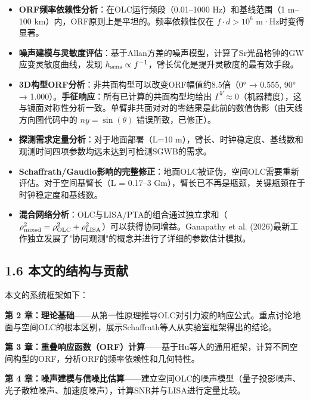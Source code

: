 \documentclass[12pt,a4paper]{article}
\begin{document}
\begin{itemize}
  \item[1] \textbf{ORF频率依赖性分析}：在OLC运行频段（0.01–1000 Hz）和基线范围（1 m–100 km）内，ORF原则上是平坦的。频率依赖性仅在 $f \cdot d > 10^6$ m·Hz时变得显著。

  \item[2] \textbf{噪声建模与灵敏度评估}：基于Allan方差的噪声模型，计算了Sr光晶格钟的GW应变灵敏度曲线，发现 $h_{\rm sens} \propto f^{-1}$，臂长优化是提升灵敏度的最有效手段。

  \item[3] \textbf{3D构型ORF分析}：非共面构型可以改变ORF幅值约8.5倍（0° → 0.555, 90° → 1.000）。\textbf{手征响应}：所有已计算的共面构型均给出 $\Gamma^V \approx 0$（机器精度），这与镜面对称性分析一致。单臂非共面对对的零结果是此前的数值伪影（由天线方向图代码中的 $ny = \sin(\theta)$ 错误所致，已修正）。

  \item[4] \textbf{探测需求定量分析}：对于地面部署（L=10 m），臂长、时钟稳定度、基线数和观测时间四项参数均远未达到可检测SGWB的需求。

  \item[5] \textbf{Schaffrath/Gaudio影响的完整修正}：地面OLC被证伪，空间OLC需要重新评估。对于空间基臂长（L = 0.17–3 Gm），臂长已不再是瓶颈，关键瓶颈在于时钟稳定度和基线数。

  \item[6] \textbf{混合网络分析}：OLC与LISA/PTA的组合通过独立求和（$\rho_{\rm mixed}^2 = \rho_{\rm OLC}^2 + \rho_{\rm LISA}^2$）可以获得协同增益。Ganapathy et al. (2026)最新工作独立发展了"协同观测"的概念并进行了详细的参数估计模拟\cite{ref11}。

\end{itemize}
\subsection{1.6 本文的结构与贡献}


本文的系统框架如下：

\textbf{第 2 章：理论基础}——从第一性原理推导OLC对引力波的响应公式。重点讨论地面与空间OLC的根本区别，展示Schaffrath等人从实验室框架得出的结论。

\textbf{第 3 章：重叠响应函数（ORF）计算}——基于Hu等人的通用框架，计算不同空间构型的ORF，分析ORF的频率依赖性和几何特性。

\textbf{第 4 章：噪声建模与信噪比估算}——建立空间OLC的噪声模型（量子投影噪声、光子散粒噪声、加速度噪声），计算SNR并与LISA进行定量比较。
\end{document}
